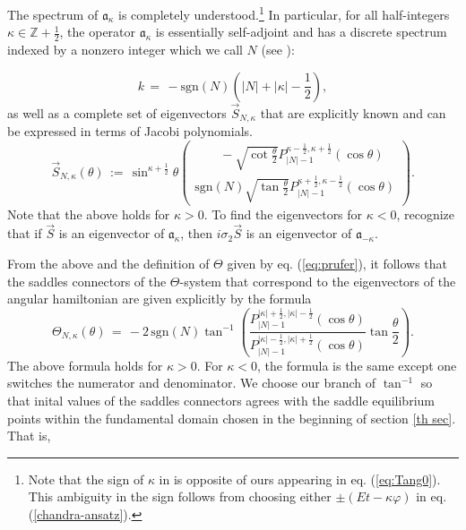\documentclass[11 pt]{article}
\renewcommand\({\left(}
\renewcommand\){\right)}
\newcommand\<{\langle}
\renewcommand\>{\rangle}
\newcommand\8{\infty}
\newcommand\beq{\begin{equation}}
\newcommand\eeq{\end{equation}}
\newcommand{\ka} {\kappa}
\newcommand{\si} {\sigma}\newcommand{\Si}{\Sigma}
\newcommand{\fa}{\mathfrak{a}}
\newcommand{\half}{\frac{1}{2}}
\newcommand{\sgn}{\mbox{sgn}}
\begin{document}
The spectrum of $\fa_\ka$ is completely understood\cite[Appendix A]{BSW}.\footnote{Note that the sign of $\kappa$ in \cite[eq. (5)]{BSW} is opposite of ours appearing in eq. (\ref{eq:Tang0}). This ambiguity in the sign follows from choosing either $\pm (Et - \kappa \varphi)$ in eq. (\ref{chandra-ansatz}).} In particular, for all half-integers $\ka \in \mathbb{Z} + \half$, the operator $\fa_\ka$ is essentially self-adjoint and has a discrete spectrum indexed by a nonzero integer which we call $N$ (see \cite[eq. (7)]{BSW}):

\beq\label{kintermsofN}
k \,=\, -\sgn(N) \left( |N| + |\ka| - \half\right),
\eeq
as well as a complete set of eigenvectors $\vec{S}_{N,\ka}$ that are explicitly known and can be expressed in terms of Jacobi polynomials.
\begin{equation}
\vec{S}_{N,\ka}(\theta) \,:=\, \sin^{\ka+\half} \theta \left(\begin{array}{c} 
\qquad -\sqrt{\cot\frac{\theta}{2}} P_{|N|-1}^{\ka-\half,\ka+\half}(\cos\theta) \\
\sgn(N)\sqrt{\tan\frac{\theta}{2}} P_{|N|-1}^{\ka+\half,\ka-\half}(\cos\theta)
\end{array}\right).
\end{equation}
Note that the above holds for $\ka>0$.  To find the eigenvectors for $\ka<0$, recognize that if $\vec{S}$ is an eigenvector of $\fa_\ka$, then $i\si_2 \vec{S}$ is an eigenvector of $\fa_{-\ka}$. 

From the above and the definition of $\Theta$ given by eq. (\ref{eq:prufer}), it follows that the saddles connectors of the $\Theta$-system that correspond to the eigenvectors of the angular hamiltonian are given explicitly by the formula
\begin{equation}
\Theta_{N,\ka}(\theta) \,=\,  -2\,\sgn(N)  \tan^{-1}\left(\frac{P_{|N|-1}^{|\ka|+\half,|\ka|-\half}(\cos\theta)}{P_{|N|-1}^{|\ka|-\half,|\ka|+\half}(\cos\theta)}\tan \frac{\theta}{2}  \right) .
\end{equation}
The above formula holds for $\kappa > 0$. For $\kappa < 0$, the formula is the same except one switches the numerator and denominator. We choose our branch of $\tan^{-1}$ so that inital values of the saddles connectors agrees with the saddle equilibrium points within the fundamental domain chosen in the beginning of section \ref{th sec}. That is,
\end{document}
